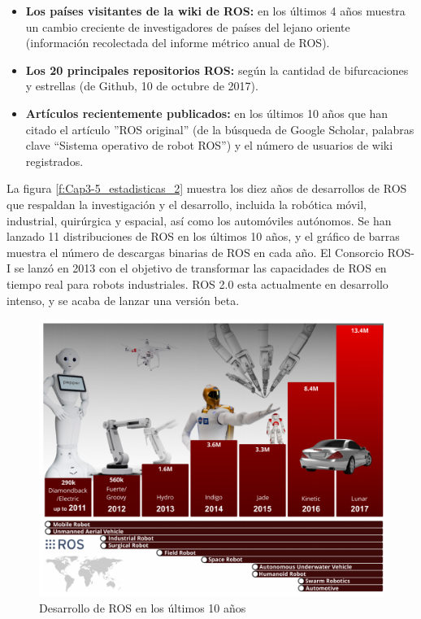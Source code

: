         \begin{itemize}
            \item {\textbf{Los países visitantes de la wiki de ROS:} en los últimos 4 años muestra un cambio creciente de investigadores de países del lejano oriente (información recolectada del informe métrico anual de ROS). }
            \item {\textbf{Los 20 principales repositorios ROS:}  según la cantidad de bifurcaciones y estrellas (de Github, 10 de octubre de 2017).}
            \item {\textbf{Artículos recientemente publicados:} en los últimos 10 años que han citado el artículo ''ROS original'' (de la búsqueda de Google Scholar, palabras clave “Sistema operativo de robot ROS”) y el número de usuarios de wiki registrados.}
        \end{itemize}
        

        La figura \eqref{f:Cap3-5_estadisticas_2} muestra los diez años de desarrollos de ROS que respaldan la investigación y el desarrollo, incluida la robótica móvil, industrial, quirúrgica y espacial, así como los automóviles autónomos. Se han lanzado 11 distribuciones de ROS en los últimos 10 años, y el gráfico de barras muestra el número de descargas binarias de ROS en cada año. El Consorcio ROS-I se lanzó en 2013 con el objetivo de transformar las capacidades de ROS en tiempo real para robots industriales. ROS 2.0 esta actualmente en desarrollo intenso, y se acaba de lanzar una versión beta.

            \begin{figure}[htb]
                \centering
                \includegraphics[width=1.0\linewidth]{Main/Chapter3/Images3/science_robot_esta_2.png}
                \caption{Desarrollo de ROS en los últimos 10 años \cite{Zhangeaar1868}}
                \label{f:Cap3-5_estadisticas_2}
            \end{figure}  


